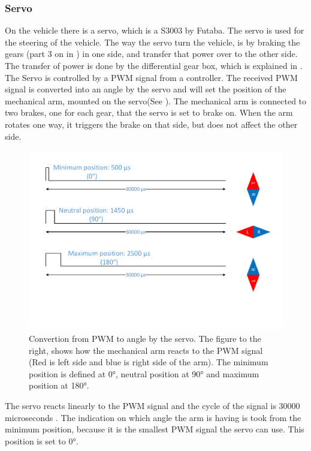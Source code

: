 \subsubsection{Servo} \label{Servo}
On the vehicle there is a servo, which is a S3003 by Futaba. 
The servo is used for the steering of the vehicle. The way the servo turn the vehicle, is by braking the gears (part 3 on  in ) in one side, and transfer that power over to the other side. The transfer of power is done by the differential gear box, which is explained in .
The Servo is controlled by a PWM signal from a controller. The received PWM signal is converted into an angle by the servo and will set the position of the mechanical arm, mounted on the servo(See ). The mechanical arm is connected to two brakes, one for each gear, that the servo is set to brake on. When the arm rotates one way, it triggers the brake on that side, but does not affect the other side.

\begin{figure}[H]
	\centering
	\includegraphics[scale=0.6]{figures/TimeVSangle.pdf}
	\caption{Convertion from PWM to angle by the servo. The figure to the right, shows how the mechanical arm reacts to the PWM signal (Red is left side and blue is right side of the arm). The minimum position is defined at 0°, neutral position at 90° and maximum position at 180°.}
	\label{timeVSangle}
\end{figure}

The servo reacts linearly to the PWM signal and the cycle of the signal is 30000 microseconds . The indication on which angle the arm is having is took from the minimum position, because it is the smallest PWM signal the servo can use. This position is set to 0°.
 
